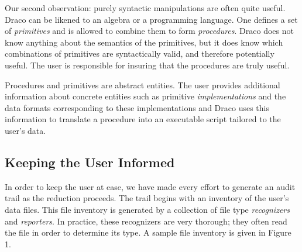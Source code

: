 Our second observation: purely syntactic manipulations are often quite useful.
Draco can be likened to an algebra or a programming language.  One defines a
set of {\it primitives} and is allowed to combine them to form
{\it procedures}.  Draco does not know anything about the semantics of the
primitives, but it does know which combinations of primitives are syntactically
valid, and therefore potentially useful. The user is responsible for insuring
that the procedures are truly useful.

Procedures and primitives are abstract entities.  The user provides additional
information about concrete entities such as primitive {\it implementations}
and the data formats corresponding to these implementations and Draco uses
this information to translate a procedure into an executable script tailored
to the user's data.

\subsection{Keeping the User Informed}
In order to keep the user at ease, we have made every effort to generate an
audit trail as the reduction proceeds.  The trail begins with an inventory of
the user's data files.  This file inventory is generated by a collection of
file type {\it recognizers} and {\it reporters}.  In practice, these
recognizers are very thorough; they often read the file in order to determine
its type.  A sample file inventory is given in Figure 1.

